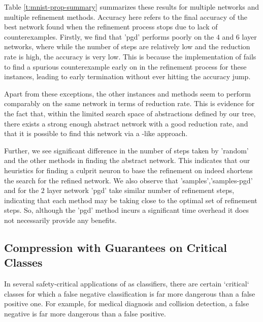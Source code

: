 Table \ref{t:mnist-prop-summary} summarizes these results for multiple \mnist
networks and multiple refinement methods. Accuracy here refers to the final
accuracy of the best network found when the refinement process stops due to lack
of counterexamples. Firstly, we find that 'pgd' performs poorly on the $4$ and
$6$ layer networks, where while the number of steps are relatively low and the
reduction rate is high, the accuracy is very low. This is because the \abcrown
implementation of \pgd fails to find a spurious counterexample early on in the
refinement process for these instances, leading to early termination without
ever hitting the accuracy jump. 

Apart from these exceptions, the other instances and methods seem to perform
comparably on the same network in terms of reduction rate. This is evidence for
the fact that, within the limited search space of abstractions defined by our
tree, there exists a strong enough abstract network with a good reduction rate,
and that it is possible to find this network via a \cegar-like approach. 

Further, we see significant difference in the number of steps taken by 'random'
and the other methods in finding the abstract network. This indicates that our
heuristics for finding a culprit neuron to base the refinement on indeed
shortens the search for the refined network. We also observe that
'samples','samples-pgd' and for the $2$ layer network 'pgd' take similar number
of refinement steps, indicating that each method may be taking close to the
optimal set of refinement steps. So, although the 'pgd' method
incurs a significant time overhead  it does not necessarily
provide any benefits. 

\subsection{Compression with Guarantees on Critical Classes}

In several safety-critical applications of \dnn as classifiers, there are
certain `critical` classes for which a false negative classification is far more
dangerous than a false positive one. For example, for medical diagnosis and
collision detection, a false negative is far more dangerous than a false
positive.

